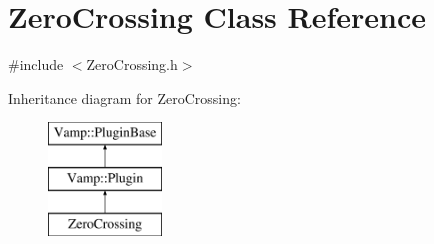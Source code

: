 \hypertarget{class_zero_crossing}{}\section{Zero\+Crossing Class Reference}
\label{class_zero_crossing}


{\ttfamily \#include $<$Zero\+Crossing.\+h$>$}

Inheritance diagram for Zero\+Crossing\+:\begin{figure}[H]
\begin{center}
\leavevmode
\includegraphics[height=3.000000cm]{class_zero_crossing}
\end{center}
\end{figure}
